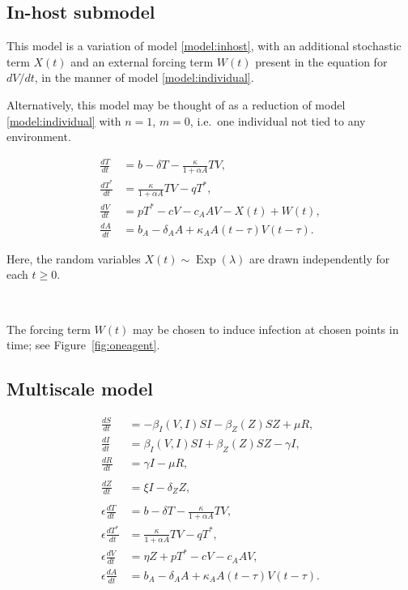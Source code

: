 \documentclass[11pt]{article}
\numberwithin{equation}{subsection}
\begin{document}
    \subsection{In-host submodel} \label{model:inhost_stochastic}

    This model is a variation of model \ref{model:inhost}, with an additional
    stochastic term $X(t)$ and an external forcing term $W(t)$ present in the
    equation for $dV/dt$, in the manner of model \ref{model:individual}.

    Alternatively, this model may be thought of as a reduction of model
    \ref{model:individual} with $n = 1$, $m = 0$, i.e.\ one individual not
    tied to any environment.

    \begin{align}
        \frac{dT}{dt} &= b -  \delta T - \frac{\kappa}{1 + \alpha A} TV, \\
        \frac{dT^*}{dt} &= \frac{\kappa}{1 + \alpha A} TV - qT^*, \\
        \frac{dV}{dt} &= pT^* - cV - c_A AV - X(t) + W(t), \\
        \frac{dA}{dt} &= b_A -  \delta_A A + \kappa_A A(t - \tau)V(t - \tau).
    \end{align}

    Here, the random variables $X(t) \sim \operatorname{Exp}(\lambda)$ are
    drawn independently for each $t \geq 0$.

    ~

    The forcing term $W(t)$ may be chosen to induce infection at chosen points
    in time; see Figure~\ref{fig:oneagent}.


    \subsection{Multiscale model} \label{model:multiscale}

    \begin{align}
        \frac{dS}{dt} &= -\beta_I(V, I) SI - \beta_Z(Z) SZ + \mu R, \\
        \frac{dI}{dt} &= \beta_I(V, I) SI + \beta_Z(Z) SZ - \gamma I, \\
        \frac{dR}{dt} &= \gamma I - \mu R, \\\\
        \frac{dZ}{dt} &= \xi I - \delta_Z Z, \\\\
        \epsilon \frac{dT}{dt} &= b -  \delta T - \frac{\kappa}{1 + \alpha A} TV, \\
        \epsilon \frac{dT^*}{dt} &= \frac{\kappa}{1 + \alpha A} TV - qT^*, \\
        \epsilon \frac{dV}{dt} &= \eta Z + pT^* - cV - c_A AV, \\
        \epsilon \frac{dA}{dt} &= b_A -  \delta_A A + \kappa_A A(t - \tau)V(t - \tau).
    \end{align}
\end{document}
